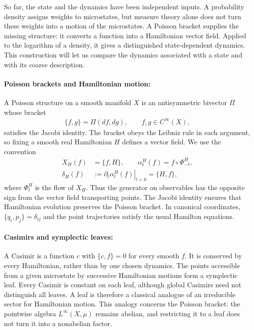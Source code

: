 \documentclass[a4paper,11pt]{article}
\theoremstyle{definition}
\newcommand{\nn}{\nonumber}
\begin{document}
So far, the state and the dynamics have been independent inputs. A probability density assigns weights to microstates, but measure theory alone does not turn these weights into a motion of the microstates. A Poisson bracket supplies the missing structure: it converts a function into a Hamiltonian vector field. Applied to the logarithm of a density, it gives a distinguished state-dependent dynamics. This construction will let us compare the dynamics associated with a state and with its coarse description.

\paragraph{Poisson brackets and Hamiltonian motion:}
A Poisson structure on a smooth manifold $X$ is an antisymmetric bivector $\Pi$ whose bracket
\begin{align}
    \{f,g\}=\Pi(df,dg),\qquad f,g\in C^\infty(X),
\end{align}
satisfies the Jacobi identity. The bracket obeys the Leibniz rule in each argument, so fixing a smooth real Hamiltonian $H$ defines a vector field. We use the convention
\begin{align}\label{eq:classical-Hamiltonian-convention}
    X_H(f)&=\{f,H\},\qquad
    \alpha_t^H(f)=f\circ\Phi_{-t}^H,\nn\\
    \delta_H(f)&:=\left.\partial_t\alpha_t^H(f)\right|_{t=0}=\{H,f\},
\end{align}
where $\Phi_t^H$ is the flow of $X_H$. Thus the generator on observables has the opposite sign from the vector field transporting points. The Jacobi identity ensures that Hamiltonian evolution preserves the Poisson bracket. In canonical coordinates, $\{q_i,p_j\}=\delta_{ij}$ and the point trajectories satisfy the usual Hamilton equations.

\paragraph{Casimirs and symplectic leaves:}
A Casimir is a function $c$ with $\{c,f\}=0$ for every smooth $f$. It is conserved by every Hamiltonian, rather than by one chosen dynamics. The points accessible from a given microstate by successive Hamiltonian motions form a symplectic leaf. Every Casimir is constant on each leaf, although global Casimirs need not distinguish all leaves. A leaf is therefore a classical analogue of an irreducible sector for Hamiltonian motion. This analogy concerns the Poisson bracket: the pointwise algebra $L^\infty(X,\mu)$ remains abelian, and restricting it to a leaf does not turn it into a nonabelian factor.
\end{document}
